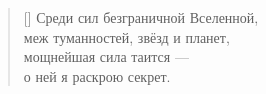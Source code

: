 \documentclass[a5paper,11pt]{memoir}
\begin{document}
\newpage
\hfill

\BgThispage


\newpage
\PlainPoemTitle
{}
\vspace{2cm}
\label{poem:willpower.ru}
\begin{verse}[\versewidth]
\hspace{1.5cm}Среди сил безграничной Вселенной, \\
\hspace{1.4cm}меж туманностей, звёзд и планет, \\
\hspace{1.3cm}мощнейшая сила таится --- \\ 
\hspace{1.2cm}о ней я раскрою секрет.
\end{verse}
\end{document}
